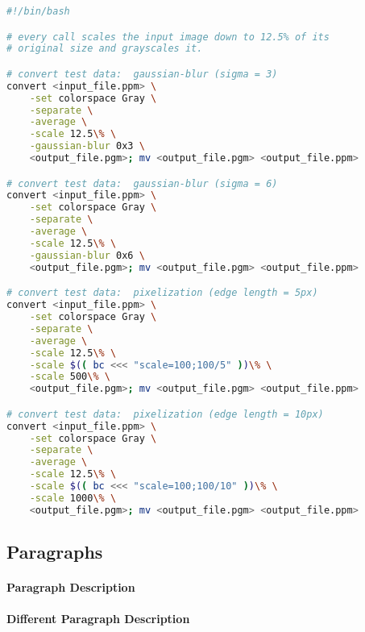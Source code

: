 \documentclass[
12pt, %
a4paper, %
oneside, %
headinclude,footinclude, %
BCOR5mm, %
german]{scrartcl}
\begin{document}
\begin{minipage}{\linewidth}
\begin{lstlisting}[language=bash,caption={Testdatenerstellung - Graustufen}]
#!/bin/bash

# every call scales the input image down to 12.5% of its
# original size and grayscales it.

# convert test data:  gaussian-blur (sigma = 3)
convert <input_file.ppm> \
    -set colorspace Gray \
    -separate \
    -average \
    -scale 12.5\% \
    -gaussian-blur 0x3 \
    <output_file.pgm>; mv <output_file.pgm> <output_file.ppm>

# convert test data:  gaussian-blur (sigma = 6)
convert <input_file.ppm> \
    -set colorspace Gray \
    -separate \
    -average \
    -scale 12.5\% \
    -gaussian-blur 0x6 \
    <output_file.pgm>; mv <output_file.pgm> <output_file.ppm>

# convert test data:  pixelization (edge length = 5px)
convert <input_file.ppm> \
    -set colorspace Gray \
    -separate \
    -average \
    -scale 12.5\% \
    -scale $(( bc <<< "scale=100;100/5" ))\% \
    -scale 500\% \
    <output_file.pgm>; mv <output_file.pgm> <output_file.ppm>

# convert test data:  pixelization (edge length = 10px)
convert <input_file.ppm> \
    -set colorspace Gray \
    -separate \
    -average \
    -scale 12.5\% \
    -scale $(( bc <<< "scale=100;100/10" ))\% \
    -scale 1000\% \
    <output_file.pgm>; mv <output_file.pgm> <output_file.ppm>
\end{lstlisting}
\end{minipage}







\subsection{Paragraphs}

\lipsum[6] %

\paragraph{Paragraph Description} \lipsum[7] %

\paragraph{Different Paragraph Description} \lipsum[8] %
\end{document}
